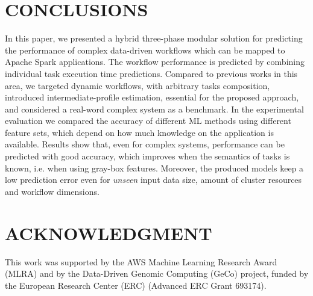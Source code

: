 \documentclass[a4paper, 10pt, conference]{ieeeconf}      %
\begin{document}
\section{CONCLUSIONS}
\label{section:conclusions}
In this paper, we presented a hybrid three-phase modular solution for predicting the performance of complex data-driven workflows which can be mapped to Apache Spark applications. The workflow performance is predicted by combining individual task execution time predictions. Compared to previous works in this area, we targeted dynamic workflows, with arbitrary tasks composition, introduced intermediate-profile estimation, essential for the proposed approach, and considered a real-word complex system as a benchmark. In the experimental evaluation we compared the accuracy of different ML methods using different feature sets, which depend on how much knowledge on the application is available. Results show that, even for complex systems, performance can be predicted with good accuracy, which improves when the semantics of tasks is known, i.e. when using gray-box features. Moreover, the produced models keep a low prediction error even for \textit{unseen} input data size, amount of cluster resources and workflow dimensions.



\section*{ACKNOWLEDGMENT}
This work was supported by the AWS Machine Learning Research Award (MLRA) and by the Data-Driven Genomic Computing (GeCo) project, funded by the European Research Center (ERC) (Advanced ERC Grant 693174).


 
\end{document}
